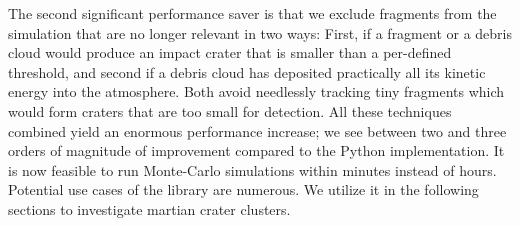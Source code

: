 The second significant performance saver is that we exclude fragments from the simulation that are no longer relevant in two ways: First, if a fragment or a debris cloud would produce an impact crater that is smaller than a per-defined threshold, and second if a debris cloud has deposited practically all its kinetic energy into the atmosphere. Both avoid needlessly tracking tiny fragments which would form craters that are too small for detection. 
All these techniques combined yield an enormous performance increase; we see between two and three orders of magnitude of improvement compared to the Python implementation.
It is now feasible to run Monte-Carlo simulations within minutes instead of hours. Potential use cases of the library are numerous. We utilize it in the following sections to investigate martian crater clusters.
